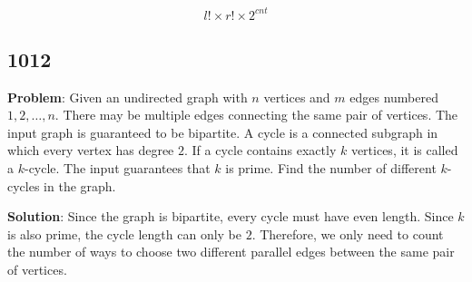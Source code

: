 \documentclass[
  a4paper,
  10pt]{article}
\begin{document}
\[
l!\times r!\times 2^{cnt}
\]

\subsection*{1012}\label{section-5}

\textbf{Problem}: Given an undirected graph with \(n\) vertices and
\(m\) edges numbered \(1,2,\dots,n\). There may be multiple edges
connecting the same pair of vertices. The input graph is guaranteed to
be bipartite. A cycle is a connected subgraph in which every vertex has
degree \(2\). If a cycle contains exactly \(k\) vertices, it is called a
\(k\)-cycle. The input guarantees that \(k\) is prime. Find the number
of different \(k\)-cycles in the graph.

\textbf{Solution}: Since the graph is bipartite, every cycle must have
even length. Since \(k\) is also prime, the cycle length can only be
\(2\). Therefore, we only need to count the number of ways to choose two
different parallel edges between the same pair of vertices.
\end{document}
